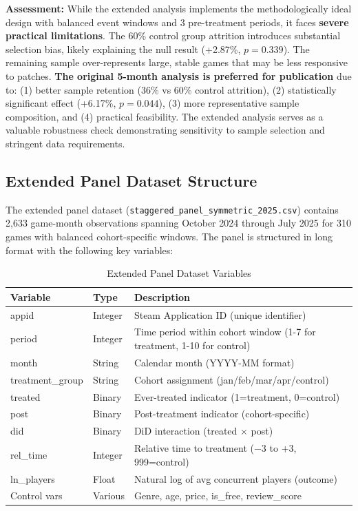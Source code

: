 \documentclass[12pt,a4paper]{article}
\begin{document}
\textbf{Assessment:} While the extended analysis implements the methodologically ideal design with balanced event windows and 3 pre-treatment periods, it faces \textbf{severe practical limitations}. The 60\% control group attrition introduces substantial selection bias, likely explaining the null result (+2.87\%, $p=0.339$). The remaining sample over-represents large, stable games that may be less responsive to patches. \textbf{The original 5-month analysis is preferred for publication} due to: (1) better sample retention (36\% vs 60\% control attrition), (2) statistically significant effect (+6.17\%, $p=0.044$), (3) more representative sample composition, and (4) practical feasibility. The extended analysis serves as a valuable robustness check demonstrating sensitivity to sample selection and stringent data requirements.

\subsection{Extended Panel Dataset Structure}
\label{subsec:extended-panel}

The extended panel dataset (\texttt{staggered\_panel\_symmetric\_2025.csv}) contains 2,633 game-month observations spanning October 2024 through July 2025 for 310 games with balanced cohort-specific windows. The panel is structured in long format with the following key variables:

\begin{table}[htbp]
\centering
\caption{Extended Panel Dataset Variables}
\label{tab:extended-panel-vars}
\begin{tabular}{llp{7cm}}
\toprule
\textbf{Variable} & \textbf{Type} & \textbf{Description} \\
\midrule
appid & Integer & Steam Application ID (unique identifier) \\
period & Integer & Time period within cohort window (1-7 for treatment, 1-10 for control) \\
month & String & Calendar month (YYYY-MM format) \\
treatment\_group & String & Cohort assignment (jan/feb/mar/apr/control) \\
treated & Binary & Ever-treated indicator (1=treatment, 0=control) \\
post & Binary & Post-treatment indicator (cohort-specific) \\
did & Binary & DiD interaction (treated $\times$ post) \\
rel\_time & Integer & Relative time to treatment ($-3$ to $+3$, 999=control) \\
ln\_players & Float & Natural log of avg concurrent players (outcome) \\
Control vars & Various & Genre, age, price, is\_free, review\_score \\
\bottomrule
\end{tabular}
\end{table}
\end{document}
